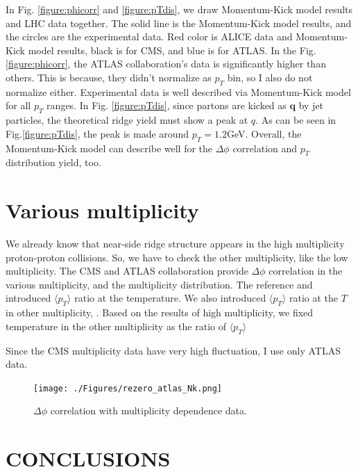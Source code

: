 \documentclass[jkps,fleqn,showpacs,showkeys]{revtex4}
\begin{document}
In Fig. \ref{figure:phicorr} and \ref{figure:pTdis}, we draw Momentum-Kick model results and LHC data together.
The solid line is the Momentum-Kick model results, and the circles are the experimental data.
Red color is ALICE data and Momentum-Kick model results, black is for CMS, and blue is for ATLAS.
In the Fig. \ref{figure:phicorr}, the ATLAS collaboration's data is significantly higher than others.
This is because, they didn't normalize as $p_T$ bin, so I also do not normalize either.
Experimental data is well described via Momentum-Kick model for all $p_T$ ranges.
In Fig. \ref{figure:pTdis}, since partons are kicked as $\textbf{q}$ by jet particles, the theoretical ridge yield must show a peak at $q$.
As can be seen in Fig.\ref{figure:pTdis}, the peak is made around $p_T=1.2$GeV.
Overall, the Momentum-Kick model can describe well for the $\Delta\phi$ correlation and $p_T$ distribution yield, too.


\section*{Various multiplicity}
\label{sec:Various multiplicity}

We already know that near-side ridge structure appears in the high multiplicity proton-proton collisions.
So, we have to check the other multiplicity, like the low multiplicity.
The CMS and ATLAS collaboration provide $\Delta \phi$ correlation in the various multiplicity, and the multiplicity distribution.
The reference \cite{Wong_5} and \cite{PbPb} introduced $\langle p_T \rangle$ ratio at the temperature.
We also introduced $\langle p_T \rangle$ ratio at the $T$ in other multiplicity, .
Based on the results of high multiplicity, we fixed temperature in the other multiplicity as the ratio of $\langle p_T \rangle$

Since the CMS multiplicity data have very high fluctuation, I use only ATLAS data.
\begin{figure}[ht]
\centering
\texttt{[image: ./Figures/rezero\_atlas\_Nk.png]}
\caption{$\Delta \phi$ correlation with multiplicity dependence data.}
\label{figure:multiplicity}
\end{figure}
    



\section*{CONCLUSIONS}
\label{sec:Conclusion}
\end{document}
